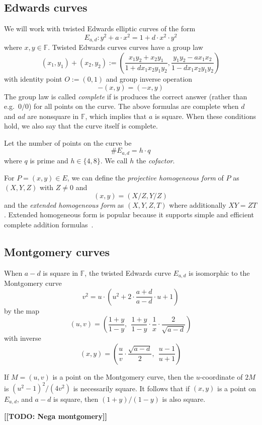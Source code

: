 \documentclass[11pt]{article}
\newcommand\todo[1]{\textbf{[[TODO: #1]]}\xspace}
\def\F{\ensuremath{\mathbb{F}}}
\def\O{\ensuremath{O}}
\begin{document}
\subsection{Edwards curves}
We will work with twisted Edwards elliptic curves of the form 
%
$$E_{a,d} : y^2 + a\cdot x^2 = 1 + d\cdot x^2\cdot y^2$$
%
where $x,y\in\F$. Twisted Edwards curves curves have a group law
$$(x_1,y_1) + (x_2,y_2) := 
\left(
\frac{x_1 y_2 + x_2 y_1}{1+d x_1 x_2 y_1 y_2},
\frac{y_1 y_2 - a x_1 x_2}{1-d x_1 x_2 y_1 y_2}
\right)
$$
with identity point $\O := (0,1)$ and group inverse operation $$-(x,y) = (-x,y)$$
The group law is called \textit{complete} if is produces the correct answer (rather than e.g.\ $0/0$) for all points on the curve.  The above formulas are complete when $d$ and $ad$ are nonsquare in \F, which implies that $a$ is square.  When these conditions hold, we also say that the curve itself is complete.

Let the number of points on the curve be $$\#E_{a,d} = h\cdot q$$ where $q$ is prime and $h\in\{4,8\}$.  We call $h$ the \textit{cofactor}.

For $P = (x,y)\in E$, we can define the \textit{projective homogeneous form} of $P$ as $(X,Y,Z)$ with $Z\neq 0$ and $$(x,y) = (X/Z,Y/Z)$$ and the \textit{extended homogeneous form} as $(X,Y,Z,T)$ where additionally $XY=ZT$.  Extended homogeneous form is popular because it supports simple and efficient complete addition formulas~\cite{hisil}.

\subsection{Montgomery curves}

When $a-d$ is square in \F, the twisted Edwards curve $E_{a,d}$ is isomorphic to the Montgomery curve
$$v^2 = u\cdot\left(u^2 + 2\cdot\frac{a+d}{a-d}\cdot u + 1\right)$$
by the map
$$(u,v) = \left(\frac{1+y}{1-y},\ \ \frac{1+y}{1-y}\cdot\frac1x\cdot\frac{2}{\sqrt{a-d}}\right)$$
with inverse
$$(x,y) = \left(\frac{u}{v}\cdot\frac{\sqrt{a-d}}{2},\ \ \frac{u-1}{u+1}\right)$$

If $M = (u,v)$ is a point on the Montgomery curve, then the $u$-coordinate of $2M$ is $(u^2-1)^2 / (4v^2)$ is necessarily square.  It follows that if $(x,y)$ is a point on $E_{a,d}$, and $a-d$ is square, then $(1+y)/(1-y)$ is also square.

\todo{Nega montgomery}
\end{document}
